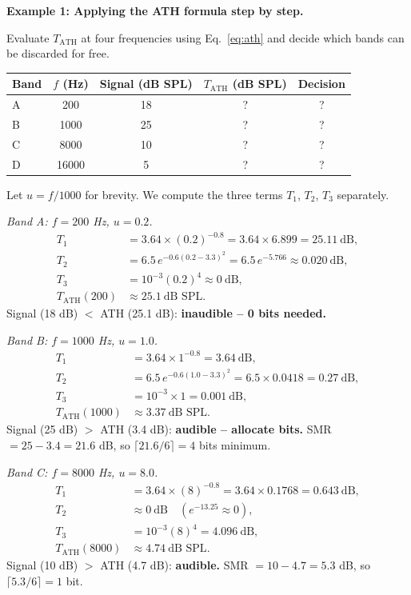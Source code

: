 \begin{examplebox}
\textbf{Example 1: Applying the ATH formula step by step.}

\medskip
Evaluate $T_{\text{ATH}}$ at four frequencies using Eq.~\eqref{eq:ath} and decide which bands can be discarded for free.

\begin{center}
\begin{tabular}{lcccc}
\toprule
Band & $f$ (Hz) & Signal (dB SPL) & $T_{\text{ATH}}$ (dB SPL) & Decision \\
\midrule
A &   200 & 18 & ? & ? \\
B &  1000 & 25 & ? & ? \\
C &  8000 & 10 & ? & ? \\
D & 16000 &  5 & ? & ? \\
\bottomrule
\end{tabular}
\end{center}

Let $u = f/1000$ for brevity. We compute the three terms $T_1$, $T_2$, $T_3$ separately.

\medskip
\noindent\textit{Band A: $f = 200$ Hz, $u = 0.2$.}
\begin{align*}
T_1 &= 3.64 \times (0.2)^{-0.8} = 3.64 \times 6.899 = 25.11\ \text{dB}, \\
T_2 &= 6.5\,e^{-0.6(0.2 - 3.3)^2} = 6.5\,e^{-5.766} \approx 0.020\ \text{dB}, \\
T_3 &= 10^{-3}(0.2)^4 \approx 0\ \text{dB}, \\
T_{\text{ATH}}(200) &\approx 25.1\ \text{dB SPL}.
\end{align*}
Signal (18 dB) $<$ ATH (25.1 dB): \textbf{inaudible -- 0 bits needed.}

\medskip
\noindent\textit{Band B: $f = 1000$ Hz, $u = 1.0$.}
\begin{align*}
T_1 &= 3.64 \times 1^{-0.8} = 3.64\ \text{dB}, \\
T_2 &= 6.5\,e^{-0.6(1.0-3.3)^2} = 6.5 \times 0.0418 = 0.27\ \text{dB}, \\
T_3 &= 10^{-3} \times 1 = 0.001\ \text{dB}, \\
T_{\text{ATH}}(1000) &\approx 3.37\ \text{dB SPL}.
\end{align*}
Signal (25 dB) $>$ ATH (3.4 dB): \textbf{audible -- allocate bits.} SMR $= 25 - 3.4 = 21.6$ dB, so $\lceil 21.6/6 \rceil = 4$ bits minimum.

\medskip
\noindent\textit{Band C: $f = 8000$ Hz, $u = 8.0$.}
\begin{align*}
T_1 &= 3.64 \times (8)^{-0.8} = 3.64 \times 0.1768 = 0.643\ \text{dB}, \\
T_2 &\approx 0\ \text{dB} \quad (e^{-13.25} \approx 0), \\
T_3 &= 10^{-3}(8)^4 = 4.096\ \text{dB}, \\
T_{\text{ATH}}(8000) &\approx 4.74\ \text{dB SPL}.
\end{align*}
Signal (10 dB) $>$ ATH (4.7 dB): \textbf{audible.} SMR $= 10 - 4.7 = 5.3$ dB, so $\lceil 5.3/6 \rceil = 1$ bit.


\end{examplebox}
